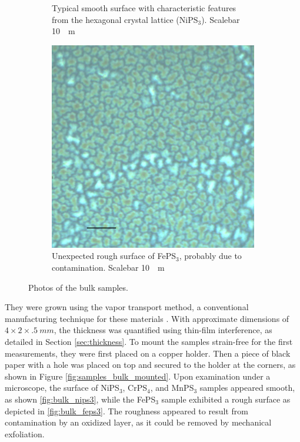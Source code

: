 \documentclass[
	twoside,
	parskip=half,
	a4paper,
]{scrbook}
\begin{document}
\begin{figure}
\begin{subfigure}[t]{.24\textwidth}
		\caption{Typical smooth surface with characteristic features from the hexagonal crystal lattice (NiPS$_3$). Scalebar \SI{10}{\mu m}}
		\label{fig:bulk_nips3}
	\end{subfigure}
	\begin{subfigure}[t]{.24\textwidth}
		\vskip 0pt
		\includegraphics[width=\textwidth]{../../data/2023-11-02/i009_FePS3_100x-scalebar.png}
		\caption{Unexpected rough surface of FePS$_3$, probably due to contamination.  Scalebar \SI{10}{\mu m}}
		\label{fig:bulk_feps3}
	\end{subfigure}
	\caption{Photos of the bulk samples.}
\end{figure}
They were grown using the vapor transport method, a conventional manufacturing technique for these materials \cite{MPX_review, AFM_review}.
With approximate dimensions of $4 \times 2 \times \SI{.5}{mm}$, the thickness was quantified using thin-film interference, as detailed in Section \ref{sec:thickness}.
To mount the samples strain-free for the first measurements, they were first placed on a copper holder.
Then a piece of black paper with a hole was placed on top and secured to the holder at the corners, as shown in Figure \autoref{fig:samples_bulk_mounted}.
Upon examination under a microscope, the surface of NiPS$_3$, CrPS$_4$, and MnPS$_3$ samples appeared smooth, as shown \autoref{fig:bulk_nips3}, while the FePS$_3$ sample exhibited a rough surface as depicted in \autoref{fig:bulk_feps3}.
The roughness appeared to result from contamination by an oxidized layer, as it could be removed by mechanical exfoliation.
\end{document}
